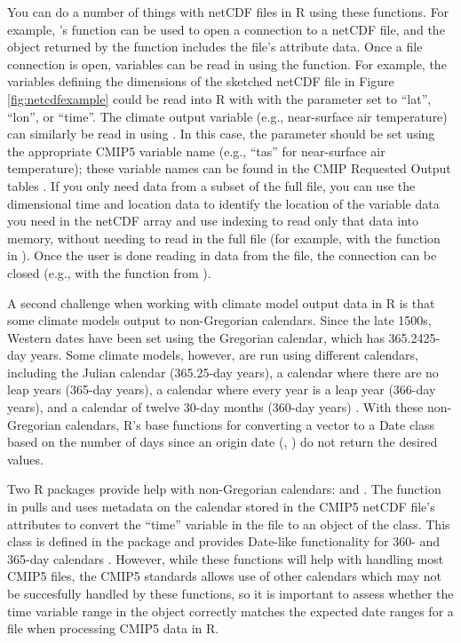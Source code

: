 You can do a number of things with netCDF files in R using these
functions. For example, 's  function can be
used to open a connection to a netCDF file, and the object returned by
the function includes the file's attribute data. Once a file connection
is open, variables can be read in using the  function.
For example, the variables defining the dimensions of the sketched
netCDF file in Figure \ref{fig:netcdfexample} could be read into R with
 with the  parameter set to ``lat'',
``lon'', or ``time''. The climate output variable (e.g., near-surface
air temperature) can similarly be read in using . In
this case, the  parameter should be set using the
appropriate CMIP5 variable name (e.g., ``tas'' for near-surface air
temperature); these variable names can be found in the CMIP Requested
Output tables \citep{taylor2010cmip5}. If you only need data from a
subset of the full file, you can use the dimensional time and location
data to identify the location of the variable data you need in the
netCDF array and use indexing to read only that data into memory,
without needing to read in the full file (for example, with the
 function in ). Once
the user is done reading in data from the file, the connection can be
closed (e.g., with the  function from ).

A second challenge when working with climate model output data in R is
that some climate models output to non-Gregorian calendars. Since the
late 1500s, Western dates have been set using the Gregorian calendar,
which has 365.2425-day years. Some climate models, however, are run
using different calendars, including the Julian calendar (365.25-day
years), a calendar where there are no leap years (365-day years), a
calendar where every year is a leap year (366-day years), and a calendar
of twelve 30-day months (360-day years) \citep{cfconventions}. With
these non-Gregorian calendars, R's base functions for converting a
vector to a Date class based on the number of days since an origin date
(, ) do not return the desired values.

Two R packages provide help with non-Gregorian calendars: 
\citep{PCICt} and  \citep{ncdf4.helpers}. The
 function in  pulls and uses
metadata on the calendar stored in the CMIP5 netCDF file's attributes to
convert the ``time'' variable in the file to an object of the
 class. This class is defined in the  package and
provides Date-like functionality for 360- and 365-day calendars
\citep{PCICt}. However, while these functions will help with handling
most CMIP5 files, the CMIP5 standards allows use of other calendars
which may not be succesfully handled by these functions, so it is
important to assess whether the time variable range in the 
object correctly matches the expected date ranges for a file when
processing CMIP5 data in R.

